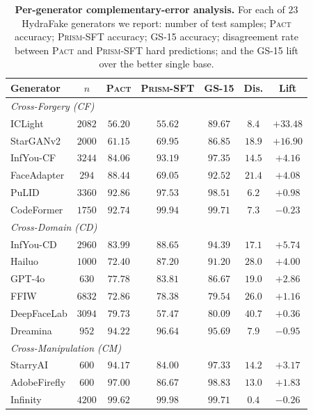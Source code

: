 \documentclass[10pt,twocolumn,letterpaper]{article}
\newcommand{\vfive}{\textsc{Pact}}
\newcommand{\prism}{\textsc{Prism-SFT}}
\begin{document}
\begin{table}[t]
\centering
\footnotesize
\setlength{\tabcolsep}{2.5pt}
\caption{\textbf{Per-generator complementary-error analysis.} For each of $23$ HydraFake generators we report: number of test samples; \vfive{} accuracy; \prism{} accuracy; \textsc{GS-15} accuracy; disagreement rate between \vfive{} and \prism{} hard predictions; and the \textsc{GS-15} lift over the better single base.}
\label{tab:headroom_lift}
\begin{tabular}{l c c c c c c}
\toprule
Generator & $n$ & \vfive & \prism & GS-15 & Dis. & Lift \\
\midrule
\multicolumn{7}{l}{\emph{Cross-Forgery (CF)}} \\
ICLight     & $2082$ & $56.20$ & $55.62$ & $89.67$ & $8.4$ & $\mathbf{+33.48}$ \\
StarGANv2   & $2000$ & $61.15$ & $69.95$ & $86.85$ & $18.9$ & $\mathbf{+16.90}$ \\
InfYou-CF   & $3244$ & $84.06$ & $93.19$ & $97.35$ & $14.5$ & $+4.16$ \\
FaceAdapter & $294$  & $88.44$ & $69.05$ & $92.52$ & $21.4$ & $+4.08$ \\
PuLID       & $3360$ & $92.86$ & $97.53$ & $98.51$ & $6.2$  & $+0.98$ \\
CodeFormer  & $1750$ & $92.74$ & $99.94$ & $99.71$ & $7.3$  & $-0.23$ \\
\midrule
\multicolumn{7}{l}{\emph{Cross-Domain (CD)}} \\
InfYou-CD   & $2960$ & $83.99$ & $88.65$ & $94.39$ & $17.1$ & $+5.74$ \\
Hailuo      & $1000$ & $72.40$ & $87.20$ & $91.20$ & $28.0$ & $+4.00$ \\
GPT-4o      & $630$  & $77.78$ & $83.81$ & $86.67$ & $19.0$ & $+2.86$ \\
FFIW        & $6832$ & $72.86$ & $78.38$ & $79.54$ & $26.0$ & $+1.16$ \\
DeepFaceLab & $3094$ & $79.73$ & $57.47$ & $80.09$ & $40.7$ & $+0.36$ \\
Dreamina    & $952$  & $94.22$ & $96.64$ & $95.69$ & $7.9$  & $-0.95$ \\
\midrule
\multicolumn{7}{l}{\emph{Cross-Manipulation (CM)}} \\
StarryAI    & $600$  & $94.17$ & $84.00$ & $97.33$ & $14.2$ & $+3.17$ \\
AdobeFirefly & $600$ & $97.00$ & $86.67$ & $98.83$ & $13.0$ & $+1.83$ \\
Infinity    & $4200$ & $99.62$ & $99.98$ & $99.71$ & $0.4$  & $-0.26$ \\

\end{tabular}
\end{table}
\end{document}
